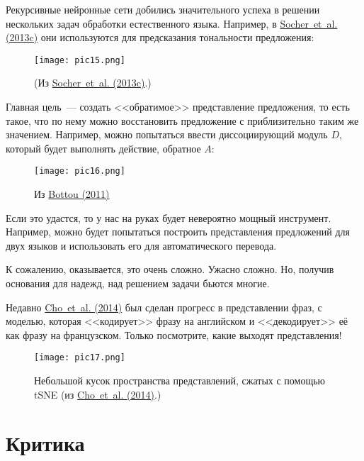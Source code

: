 \documentclass[a4paper,12pt]{article}
\begin{document}
Рекурсивные нейронные сети добились значительного успеха в решении нескольких задач обработки естественного языка. Например, в \href{http://nlp.stanford.edu/~socherr/EMNLP2013_RNTN.pdf}{Socher~et~al. (2013c)} они используются для предсказания тональности предложения:

\begin{figure}[t]
\begin{center}
\texttt{[image: pic15.png]}
\caption{(Из \href{http://nlp.stanford.edu/~socherr/EMNLP2013_RNTN.pdf}{Socher~et~al. (2013c)}.)}
\end{center}
\end{figure}

Главная цель~--- создать <<обратимое>> представление предложения, то есть такое, что по нему можно восстановить предложение с приблизительно таким же значением. Например, можно попытаться ввести диссоциирующий модуль $D$, который будет выполнять действие, обратное $A$:

\begin{figure}[t]
\begin{center}
\texttt{[image: pic16.png]}
\caption{Из \href{http://arxiv.org/pdf/1102.1808v3.pdf}{Bottou (2011)}}
\end{center}
\end{figure}

Если это удастся, то у нас на руках будет невероятно мощный инструмент. Например, можно будет попытаться построить представления предложений для двух языков и использовать его для автоматического перевода.

К сожалению, оказывается, это очень сложно. Ужасно сложно. Но, получив основания для надежд, над решением задачи бьются многие.

Недавно  \href{http://arxiv.org/pdf/1406.1078v1.pdf}{Cho~et~al. (2014)} был сделан прогресс в представлении фраз, с моделью, которая <<кодирует>> фразу на английском и <<декодирует>> её как фразу на французском. Только посмотрите, какие выходят представления!

\begin{figure}[t]
\begin{center}
\texttt{[image: pic17.png]}
\caption{Небольшой кусок пространства представлений, сжатых с помощью tSNE (из \href{http://arxiv.org/pdf/1406.1078v1.pdf}{Cho~et~al. (2014)}.)}
\end{center}
\end{figure}

\section*{Критика}
\end{document}
